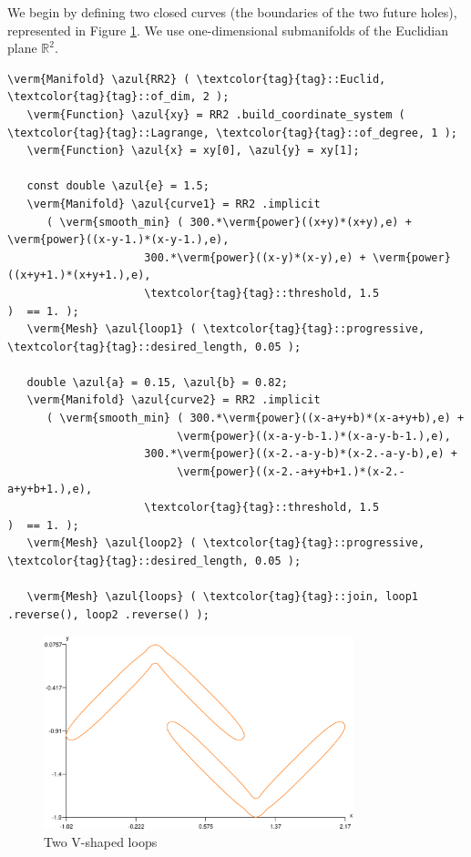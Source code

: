 We begin by defining two closed curves (the boundaries of the two future holes),
represented in Figure \ref{\numb section 7.\numb fig 14}.
We use one-dimensional submanifolds of the Euclidian plane $ \mathbb{R}^2 $.

\begin{Verbatim}[commandchars=\\\{\},formatcom=\small\tt,frame=single,
   rulecolor=\color{coment},baselinestretch=0.94,framesep=2mm         ]
   \verm{Manifold} \azul{RR2} ( \textcolor{tag}{tag}::Euclid, \textcolor{tag}{tag}::of_dim, 2 );
   \verm{Function} \azul{xy} = RR2 .build_coordinate_system ( \textcolor{tag}{tag}::Lagrange, \textcolor{tag}{tag}::of_degree, 1 );
   \verm{Function} \azul{x} = xy[0], \azul{y} = xy[1];
   
   const double \azul{e} = 1.5;
   \verm{Manifold} \azul{curve1} = RR2 .implicit 
      ( \verm{smooth_min} ( 300.*\verm{power}((x+y)*(x+y),e) + \verm{power}((x-y-1.)*(x-y-1.),e),
                     300.*\verm{power}((x-y)*(x-y),e) + \verm{power}((x+y+1.)*(x+y+1.),e),
                     \textcolor{tag}{tag}::threshold, 1.5                     )  == 1. );
   \verm{Mesh} \azul{loop1} ( \textcolor{tag}{tag}::progressive, \textcolor{tag}{tag}::desired_length, 0.05 );
      
   double \azul{a} = 0.15, \azul{b} = 0.82;
   \verm{Manifold} \azul{curve2} = RR2 .implicit 
      ( \verm{smooth_min} ( 300.*\verm{power}((x-a+y+b)*(x-a+y+b),e) +
                          \verm{power}((x-a-y-b-1.)*(x-a-y-b-1.),e),
                     300.*\verm{power}((x-2.-a-y-b)*(x-2.-a-y-b),e) +
                          \verm{power}((x-2.-a+y+b+1.)*(x-2.-a+y+b+1.),e),
                     \textcolor{tag}{tag}::threshold, 1.5                           )  == 1. );
   \verm{Mesh} \azul{loop2} ( \textcolor{tag}{tag}::progressive, \textcolor{tag}{tag}::desired_length, 0.05 );

   \verm{Mesh} \azul{loops} ( \textcolor{tag}{tag}::join, loop1 .reverse(), loop2 .reverse() );                     
\end{Verbatim}

\begin{figure}[ht] \centering
  \includegraphics[width=90mm]{boomerang-1.eps}
  \caption{Two V-shaped loops}
  \label{\numb section 7.\numb fig 14}
\end{figure}

